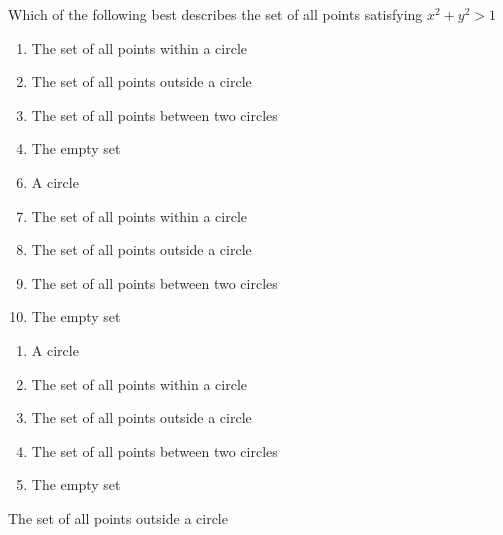 




 Which of the following best describes the set of all points satisfying $x^{2}+y^{2}>1$


\ifsat
	\begin{enumerate}[label=\Alph*)]
		\item  The set of all points within a circle
		\item  The set of all points outside a circle %
		\item  The set of all points between two circles
		\item  The empty set
	\end{enumerate}
\else
\fi

\ifacteven
	\begin{enumerate}[label=\textbf{\Alph*.},itemsep=\fill,align=left]
		\setcounter{enumii}{5}
		\item   A circle
		\item  The set of all points within a circle
		\item  The set of all points outside a circle %
		\addtocounter{enumii}{1}
		\item  The set of all points between two circles
		\item  The empty set
	\end{enumerate}
\else
\fi

\ifactodd
	\begin{enumerate}[label=\textbf{\Alph*.},itemsep=\fill,align=left]
		\item   A circle
		\item  The set of all points within a circle
		\item  The set of all points outside a circle %
		\item  The set of all points between two circles
		\item  The empty set
	\end{enumerate}
\else
\fi

\ifgridin
  The set of all points outside a circle %
		
\else
\fi


